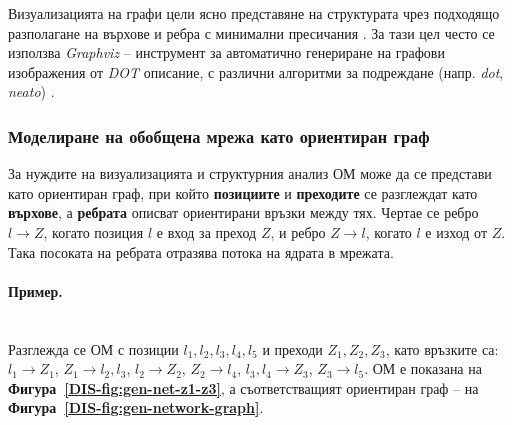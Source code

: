 \hspace*{2.5em}Визуализацията на графи цели ясно представяне на структурата чрез подходящо разполагане на върхове и ребра с минимални пресичания \cite{DIS-Kamada1989}. За тази цел често се използва \textit{Graphviz} -- инструмент за автоматично генериране на графови изображения от \textit{DOT} описание, с различни алгоритми за подреждане (напр. \textit{dot}, \textit{neato}) \cite{DIS-Ellson2004}.

\subsubsection{Моделиране на обобщена мрежа като ориентиран граф}

\hspace*{2.5em}За нуждите на визуализацията и структурния анализ ОМ може да се представи като ориентиран граф, при който \textbf{позициите} и \textbf{преходите} се разглеждат като \textbf{върхове}, а \textbf{ребрата} описват ориентирани връзки между тях. Чертае се ребро \(l \rightarrow Z\), когато позиция \(l\) е вход за преход \(Z\), и ребро \(Z \rightarrow l\), когато \(l\) е изход от \(Z\). Така посоката на ребрата отразява потока на ядрата в мрежата.

\paragraph{Пример.}
\mbox{}\\
Разглежда се ОМ с позиции \(l_1, l_2, l_3, l_4, l_5\) и преходи \(Z_1, Z_2, Z_3\), като връзките са:
\(l_1 \rightarrow Z_1\), \(Z_1 \rightarrow l_2, l_3\), \(l_2 \rightarrow Z_2\), \(Z_2 \rightarrow l_4\), \(l_3, l_4 \rightarrow Z_3\), \(Z_3 \rightarrow l_5\).
ОМ е показана на \textbf{Фигура~\ref{DIS-fig:gen-net-z1-z3}}, а съответстващият ориентиран граф -- на \textbf{Фигура~\ref{DIS-fig:gen-network-graph}}.

\vspace{0.2cm}

